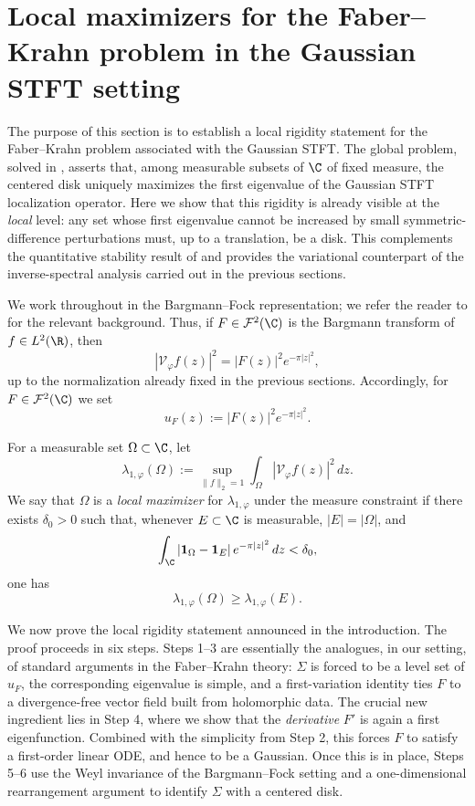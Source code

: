 \section{Local maximizers for the Faber--Krahn problem in the Gaussian STFT setting}

The purpose of this section is to establish a local rigidity statement for the
Faber--Krahn problem associated with the Gaussian STFT. The global problem,
solved in \cite{Nicola-Tilli}, asserts that, among measurable subsets of \(\C\)
of fixed measure, the centered disk uniquely maximizes the first eigenvalue of
the Gaussian STFT localization operator. Here we show that this rigidity is
already visible at the \emph{local} level: any set whose first eigenvalue cannot
be increased by small symmetric-difference perturbations must, up to a
translation, be a disk. This complements the quantitative stability result of
\cite{Gomez-Guerra-Ramos-Tilli} and provides the variational counterpart of the
inverse-spectral analysis carried out in the previous sections.

We work throughout in the Bargmann--Fock representation; we refer the reader to
\cite{Bargmann,Folland,Grochenig} for the relevant background. Thus, if
\(F\in \mathcal F^2(\C)\) is the Bargmann transform of \(f\in L^2(\R)\), then
\[
|\mathcal V_\varphi f(z)|^2 = |F(z)|^2 e^{-\pi |z|^2},
\]
up to the normalization already fixed in the previous sections. Accordingly, for
\(F\in \mathcal F^2(\C)\) we set
\[
u_F(z):=|F(z)|^2 e^{-\pi |z|^2}.
\]

For a measurable set \(\Omega\subset \C\), let
\[
\lambda_{1,\varphi}(\Omega)
:=
\sup_{\|f\|_2=1}\int_\Omega |\mathcal V_\varphi f(z)|^2\,dz.
\]
We say that \(\Omega\) is a \emph{local maximizer} for \(\lambda_{1,\varphi}\) under the
measure constraint if there exists \(\delta_0>0\) such that, whenever
\(E\subset \C\) is measurable, \(|E|=|\Omega|\), and
\[
\int_\C |\mathbf 1_\Omega-\mathbf 1_E|\,e^{-\pi |z|^2}\,dz<\delta_0,
\]
one has
\[
\lambda_{1,\varphi}(\Omega)\ge \lambda_{1,\varphi}(E).
\]

We now prove the local rigidity statement announced in the introduction. The
proof proceeds in six steps. Steps 1--3 are essentially the analogues, in our
setting, of standard arguments in the Faber--Krahn theory: \(\Sigma\) is forced
to be a level set of \(u_F\), the corresponding eigenvalue is simple, and a
first-variation identity ties \(F\) to a divergence-free vector field built from
holomorphic data. The crucial new ingredient lies in Step 4, where we show that
the \emph{derivative} \(F'\) is again a first eigenfunction. Combined with the
simplicity from Step 2, this forces \(F\) to satisfy a first-order linear ODE,
and hence to be a Gaussian. Once this is in place, Steps 5--6 use the Weyl
invariance of the Bargmann--Fock setting and a one-dimensional rearrangement
argument to identify \(\Sigma\) with a centered disk.

